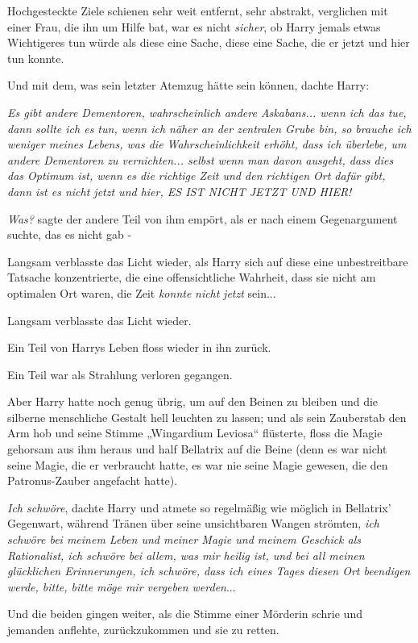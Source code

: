 {Hochgesteckte Ziele schienen sehr weit entfernt, sehr abstrakt, verglichen mit einer Frau, die ihn um Hilfe bat, war es nicht \emph{sicher}, ob Harry jemals etwas Wichtigeres tun würde als diese eine Sache, diese eine Sache, die er jetzt und hier tun konnte.

Und mit dem, was sein letzter Atemzug hätte sein können, dachte Harry:

\emph{\emph{Es gibt andere Dementoren, wahrscheinlich andere Askabans... wenn ich das tue, dann sollte ich es tun, wenn ich näher an der zentralen Grube bin, so brauche ich weniger meines Lebens, was die Wahrscheinlichkeit erhöht, dass ich überlebe, um andere Dementoren zu vernichten... selbst wenn man davon ausgeht, dass dies das Optimum ist, wenn es die richtige Zeit und den richtigen Ort dafür gibt, dann ist es nicht jetzt und hier, ES IST NICHT JETZT UND HIER!}}

\emph{Was?} sagte der andere Teil von ihm empört, als er nach einem Gegenargument suchte, das es nicht gab -

Langsam verblasste das Licht wieder, als Harry sich auf diese eine unbestreitbare Tatsache konzentrierte, die eine offensichtliche Wahrheit, dass sie nicht am optimalen Ort waren, die Zeit \emph{konnte} \emph{nicht} \emph{jetzt} sein...

Langsam verblasste das Licht wieder.

Ein Teil von Harrys Leben floss wieder in ihn zurück.

Ein Teil war als Strahlung verloren gegangen.

Aber Harry hatte noch genug übrig, um auf den Beinen zu bleiben und die silberne menschliche Gestalt hell leuchten zu lassen; und als sein Zauberstab den Arm hob und seine Stimme „Wingardium Leviosa“ flüsterte, floss die Magie gehorsam aus ihm heraus und half Bellatrix auf die Beine (denn es war nicht seine Magie, die er verbraucht hatte, es war nie seine Magie gewesen, die den Patronus-Zauber angefacht hatte).

\emph{Ich schwöre}, dachte Harry und atmete so regelmäßig wie möglich in Bellatrix' Gegenwart, während Tränen über seine unsichtbaren Wangen strömten, \emph{ich schwöre bei meinem Leben und meiner Magie und meinem Geschick als Rationalist, ich schwöre bei allem, was mir heilig ist, und bei all meinen glücklichen Erinnerungen, ich schwöre, dass ich eines Tages diesen Ort beendigen werde, bitte, bitte möge mir vergeben werden}...

Und die beiden gingen weiter, als die Stimme einer Mörderin schrie und jemanden anflehte, zurückzukommen und sie zu retten.

}
